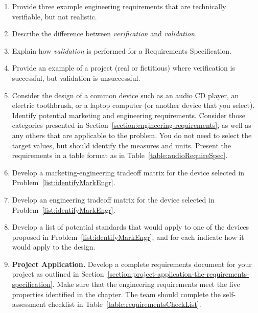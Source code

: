 \begin{enumerate}
  \item
    Provide three example engineering requirements that are technically
    verifiable, but not realistic.
  \item
    Describe the difference between \emph{verification} and
    \emph{validation}.
  \item
    Explain how \emph{validation} is performed for a Requirements
    Specification.
  \item
    Provide an example of a project (real or fictitious) where
    verification is successful, but validation is unsuccessful.
  \item
  \label{list:identifyMarkEngr}
    Consider the design of a common device such as an audio CD player,
    an electric toothbrush, or a laptop computer (or another device that
    you select). Identify potential marketing and engineering
    requirements. Consider those categories presented in 
    Section~\ref{section:engineering-requirements}, as
    well as any others that are applicable to the problem. You do not
    need to select the target values, but should identify the measures
    and units. Present the requirements in a table format as in 
    Table~\ref{table:audioRequireSpec}.
  \item
    Develop a marketing-engineering tradeoff matrix for the device
    selected in Problem~\ref{list:identifyMarkEngr}.
  \item
    Develop an engineering tradeoff matrix for the device selected in
    Problem~\ref{list:identifyMarkEngr}.
  \item
    Develop a list of potential standards that would apply to one of the
    devices proposed in Problem~\ref{list:identifyMarkEngr}, and for each indicate how it would
    apply to the design.
  \item
    \textbf{Project Application.} Develop a complete requirements
    document for your project as outlined in 
    Section~\ref{section:project-application-the-requirements-specification}. Make sure that
    the engineering requirements meet the five properties identified in
    the chapter. The team should complete the self-assessment checklist
    in Table~\ref{table:requirementsCheckList}.
\end{enumerate}